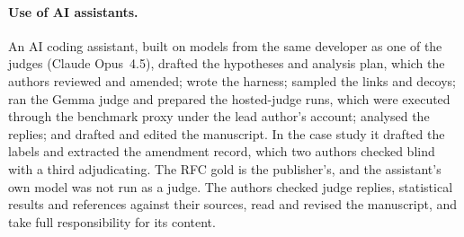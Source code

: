 \paragraph{Use of AI assistants.}\label{sec:ai-use}
An AI coding assistant, built on models from the same developer as one of the judges (Claude Opus~4.5), drafted the
hypotheses and analysis plan, which the authors reviewed and amended; wrote the harness; sampled the links and
decoys; ran the Gemma judge and prepared the hosted-judge runs, which were executed through the benchmark proxy under
the lead author's account; analysed the replies; and drafted and edited the manuscript. In the case study it drafted
the labels and extracted the amendment record, which two authors checked blind with a third adjudicating. The RFC
gold is the publisher's, and the assistant's own model was not run as a judge. The authors checked judge replies,
statistical results and references against their sources, read and revised the manuscript, and take full
responsibility for its content.
